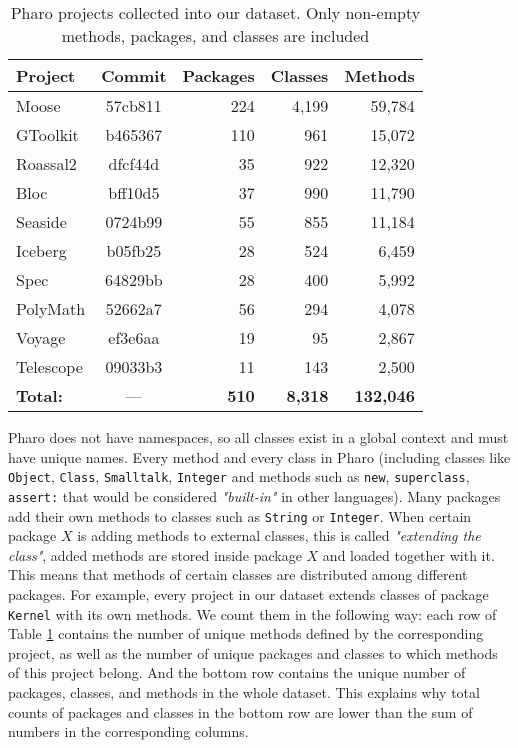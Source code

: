 \begin{table}[H]
\centering
\begin{tabular}{|l|c|r|r|r|}
\hline
\textbf{Project} & \textbf{Commit} & \textbf{Packages} & \textbf{Classes} & \textbf{Methods} \\
\hline
Moose     & 57cb811 & 224 & 4,199 & 59,784 \\
GToolkit  & b465367 & 110 & 961   & 15,072 \\
Roassal2  & dfcf44d & 35  & 922   & 12,320 \\
Bloc      & bff10d5 & 37  & 990   & 11,790 \\
Seaside   & 0724b99 & 55  & 855   & 11,184 \\
Iceberg   & b05fb25 & 28  & 524   & 6,459 \\
Spec      & 64829bb & 28  & 400   & 5,992 \\
PolyMath  & 52662a7 & 56  & 294   & 4,078 \\
Voyage    & ef3e6aa & 19  & 95    & 2,867 \\
Telescope & 09033b3 & 11  & 143   & 2,500 \\
\hline
\textbf{Total:}     & ---     & \textbf{510} & \textbf{8,318} & \textbf{132,046} \\
\hline
\end{tabular}
\caption{Pharo projects collected into our dataset. Only non-empty methods, packages, and classes are included}
\label{tab:Naturalness-DataPharo}
\end{table}

Pharo does not have namespaces, so all classes exist in a global context and must have unique names. Every method and every class in Pharo (including classes like \texttt{Object}, \texttt{Class}, \texttt{Smalltalk}, \texttt{Integer} and methods such as \texttt{new}, \texttt{superclass}, \texttt{assert:} that would be considered \textit{"built-in"} in other languages). Many packages add their own methods to classes such as \texttt{String} or \texttt{Integer}. When certain package $X$ is adding methods to external classes, this is called \textit{"extending the class"}, added methods are stored inside package $X$ and loaded together with it. This means that methods of certain classes are distributed among different packages. For example, every project in our dataset extends classes of package \texttt{Kernel} with its own methods. We count them in the following way: each row of Table \ref{tab:Naturalness-DataPharo} contains the number of unique methods defined by the corresponding project, as well as the number of unique packages and classes to which methods of this project belong. And the bottom row contains the unique number of packages, classes, and methods in the whole dataset. This explains why total counts of packages and classes in the bottom row are lower than the sum of numbers in the corresponding columns.

